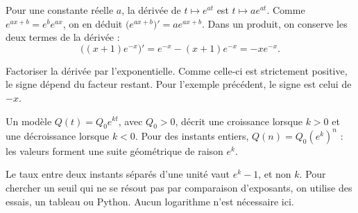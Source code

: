 \clearpage
{}
\begin{propriete}
Pour une constante réelle $a$, la dérivée de $t\mapsto e^{at}$ est $t\mapsto ae^{at}$.
Comme $e^{ax+b}=e^be^{ax}$, on en déduit $\big(e^{ax+b}\big)'=a e^{ax+b}$.
Dans un produit, on conserve les deux termes de la dérivée :
\[\big((x+1)e^{-x}\big)'=e^{-x}-(x+1)e^{-x}=-xe^{-x}.\]
\end{propriete}
\begin{savoirfaire}
Factoriser la dérivée par l'exponentielle. Comme celle-ci est strictement
positive, le signe dépend du facteur restant. Pour l'exemple précédent,
le signe est celui de $-x$.
\end{savoirfaire}
\begin{definition}
Un modèle $Q(t)=Q_0e^{kt}$, avec $Q_0>0$, décrit une croissance lorsque
$k>0$ et une décroissance lorsque $k<0$. Pour des instants entiers,
$Q(n)=Q_0(e^k)^n$ : les valeurs forment une suite géométrique de raison $e^k$.
\end{definition}
\begin{center}\par{}\end{center}
\begin{attention}
Le taux entre deux instants séparés d'une unité vaut $e^k-1$, et non $k$.
Pour chercher un seuil qui ne se résout pas par comparaison d'exposants,
on utilise des essais, un tableau ou Python. Aucun logarithme n'est nécessaire ici.
\end{attention}
\exercices

